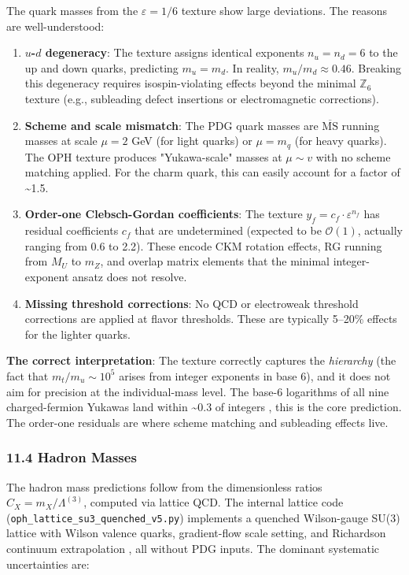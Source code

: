 The quark masses from the \(\varepsilon = 1/6\) texture show large deviations. The reasons are well-understood:

\begin{enumerate}
\def\labelenumi{\arabic{enumi}.}
\item
  \textbf{\(u\)-\(d\) degeneracy}: The texture assigns identical exponents \(n_u = n_d = 6\) to the up and down quarks, predicting \(m_u = m_d\). In reality, \(m_u/m_d \approx 0.46\). Breaking this degeneracy requires isospin-violating effects beyond the minimal \(\mathbb{Z}_6\) texture (e.g., subleading defect insertions or electromagnetic corrections).
\item
  \textbf{Scheme and scale mismatch}: The PDG quark masses are \(\overline{\text{MS}}\) running masses at scale \(\mu = 2\) GeV (for light quarks) or \(\mu = m_q\) (for heavy quarks). The OPH texture produces "Yukawa-scale" masses at \(\mu \sim v\) with no scheme matching applied. For the charm quark, this can easily account for a factor of \textasciitilde1.5.
\item
  \textbf{Order-one Clebsch-Gordan coefficients}: The texture \(y_f = c_f \cdot \varepsilon^{n_f}\) has residual coefficients \(c_f\) that are undetermined (expected to be \(\mathcal{O}(1)\), actually ranging from 0.6 to 2.2). These encode CKM rotation effects, RG running from \(M_U\) to \(m_Z\), and overlap matrix elements that the minimal integer-exponent ansatz does not resolve.
\item
  \textbf{Missing threshold corrections}: No QCD or electroweak threshold corrections are applied at flavor thresholds. These are typically 5--20\% effects for the lighter quarks.
\end{enumerate}

\textbf{The correct interpretation}: The texture correctly captures the \emph{hierarchy} (the fact that \(m_t/m_u \sim 10^5\) arises from integer exponents in base 6), and it does not aim for precision at the individual-mass level. The base-6 logarithms of all nine charged-fermion Yukawas land within \textasciitilde0.3 of integers , this is the core prediction. The order-one residuals are where scheme matching and subleading effects live.

\subsubsection{11.4 Hadron Masses}\label{114-hadron-masses}

The hadron mass predictions follow from the dimensionless ratios \(C_X = m_X/\Lambda^{(3)}\), computed via lattice QCD. The internal lattice code (\texttt{oph\_lattice\_su3\_quenched\_v5.py}) implements a quenched Wilson-gauge SU(3) lattice with Wilson valence quarks, gradient-flow scale setting, and Richardson continuum extrapolation , all without PDG inputs. The dominant systematic uncertainties are:

